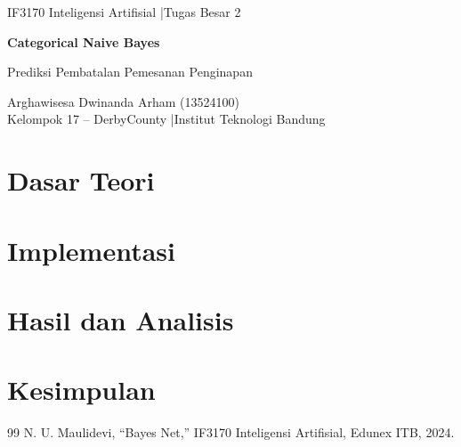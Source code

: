 \renewcommand{\thesection}{\arabic{section}}
\renewcommand{\theequation}{\arabic{equation}}
\renewcommand{\thefigure}{\arabic{figure}}
\renewcommand{\thetable}{\arabic{table}}
\renewcommand{\thelstlisting}{\arabic{lstlisting}}
\begin{center}
  {\large IF3170 Inteligensi Artifisial \enspace|\enspace Tugas Besar 2\par}
  \vspace{0.6cm}
  {\LARGE\bfseries Categorical Naive Bayes\par}
  \vspace{0.2cm}
  {\large Prediksi Pembatalan Pemesanan Penginapan\par}
  \vspace{0.4cm}
  Arghawisesa Dwinanda Arham (13524100)\\
  Kelompok 17 -- DerbyCounty \enspace|\enspace Institut Teknologi Bandung
\end{center}
\vspace{0.3cm}

\section{Dasar Teori}

\section{Implementasi}

\section{Hasil dan Analisis}

\section{Kesimpulan}


\begingroup
\let\chapter\section
\small
\begin{thebibliography}{99}
 N. U. Maulidevi, “Bayes Net,” IF3170 Inteligensi Artifisial, Edunex ITB, 2024.

\end{thebibliography}
\endgroup
